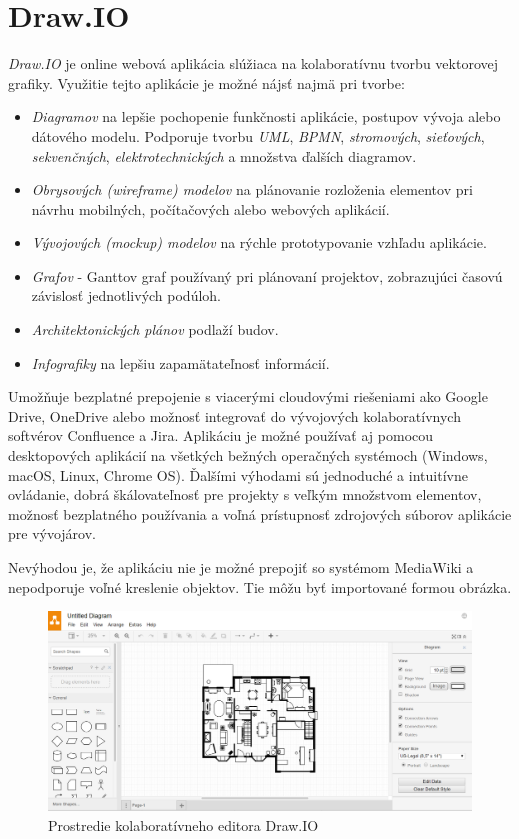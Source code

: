 \section{Draw.IO}
\textit{Draw.IO} je online webová aplikácia slúžiaca na kolaboratívnu tvorbu vektorovej grafiky. Využitie tejto aplikácie je možné nájsť najmä pri tvorbe:
\begin{itemize}
	\item \textit{Diagramov} na lepšie pochopenie funkčnosti aplikácie, postupov vývoja alebo dátového modelu. Podporuje tvorbu \textit{UML}, \textit{BPMN}, \textit{stromových}, \textit{sieťových}, \textit{sekvenčných}, \textit{elektrotechnických} a množstva ďalších diagramov.
	\item \textit{Obrysových (wireframe) modelov} na plánovanie rozloženia elementov pri návrhu mobilných, počítačových alebo webových aplikácií.
	\item \textit{Vývojových (mockup) modelov} na rýchle prototypovanie vzhľadu aplikácie.
	\item \textit{Grafov} - Ganttov graf používaný pri plánovaní projektov, zobrazujúci časovú závislosť jednotlivých podúloh.
	\item \textit{Architektonických plánov} podlaží budov.
	\item \textit{Infografiky} na lepšiu zapamätateľnosť informácií.
\end{itemize}
Umožňuje bezplatné prepojenie s viacerými cloudovými riešeniami ako Google Drive, OneDrive alebo možnosť integrovať do vývojových kolaboratívnych softvérov Confluence a Jira. Aplikáciu je možné používať aj pomocou desktopových aplikácií na všetkých bežných operačných systémoch (Windows, macOS, Linux, Chrome OS). 
Ďalšími výhodami sú jednoduché a intuitívne ovládanie, dobrá škálovateľnosť pre projekty s veľkým množstvom elementov, možnosť bezplatného používania a voľná prístupnosť zdrojových súborov aplikácie pre vývojárov.

Nevýhodou je, že aplikáciu nie je možné prepojiť so systémom MediaWiki a nepodporuje voľné kreslenie objektov. Tie môžu byť importované formou obrázka.

\begin{figure}[h]
	\centerline{\includegraphics[width=1\textwidth]{images/drawio}}
	\caption[Editor Draw.IO]{Prostredie kolaboratívneho editora Draw.IO}
	\label{obr:DrawIO}
\end{figure}
\FloatBarrier